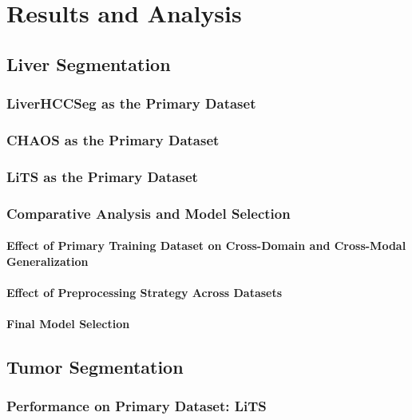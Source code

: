\chapter{Results and Analysis}
\label{chap:results}

\section{Liver Segmentation}


\subsection{LiverHCCSeg as the Primary Dataset}


\subsection{CHAOS as the Primary Dataset}


\subsection{LiTS as the Primary Dataset}


\subsection{Comparative Analysis and Model Selection}
\label{sec:liver_comparative}


\subsubsection{Effect of Primary Training Dataset on Cross-Domain and Cross-Modal Generalization}


\subsubsection{Effect of Preprocessing Strategy Across Datasets}


\subsubsection{Final Model Selection}


\section{Tumor Segmentation}


\subsection{Performance on Primary Dataset: LiTS}


